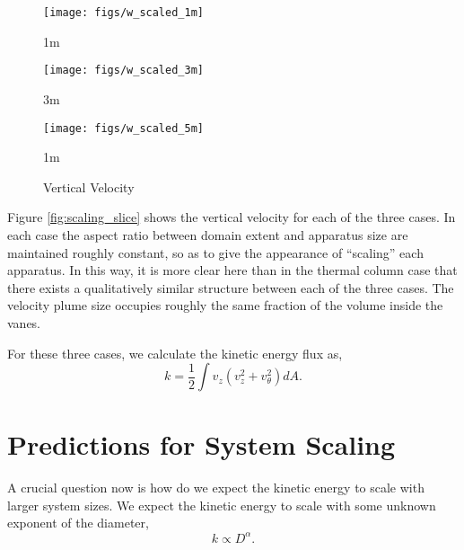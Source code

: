 \documentclass[english]{article}
\begin{document}
%
%


\begin{figure}[!htb]
\texttt{[image: figs/w\_scaled\_1m]}
\caption*{1m}\label{fig:1m_vz}
\endminipage\hfill
{}
\texttt{[image: figs/w\_scaled\_3m]}
\caption*{3m}\label{fig:3m_vz}
\endminipage\hfill
{}%
\texttt{[image: figs/w\_scaled\_5m]}
  \caption*{1m}\label{fig:5m_vz}
\endminipage
\caption{Vertical Velocity}
\end{figure}
 
Figure \ref{fig:scaling_slice} shows the vertical velocity for each of the three cases. In each case the aspect ratio between domain extent
and apparatus size are maintained roughly constant, so as to give the appearance of ``scaling'' each apparatus. In this way, it is more 
clear here than in the thermal column case that there exists a qualitatively similar structure between each of the three cases. The velocity plume 
size occupies roughly the same fraction of the volume inside the vanes. 

For these three cases, we calculate the kinetic energy flux as, 
\begin{equation}
k = \frac{1}{2} \int v_z (v_z^2 + v_{\theta}^2) dA. 
\label{ke_flux}
\end{equation}


%
%

\section*{Predictions for System Scaling}


A crucial question now is how do we expect the kinetic energy to scale with larger system sizes. We expect the 
kinetic energy to scale with some unknown exponent of the diameter, 
\begin{equation}
k \propto D^\alpha. 
\end{equation}
\end{document}
